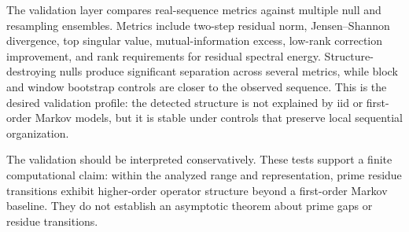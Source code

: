 The validation layer compares real-sequence metrics against multiple null and resampling ensembles. Metrics include two-step residual norm, Jensen--Shannon divergence, top singular value, mutual-information excess, low-rank correction improvement, and rank requirements for residual spectral energy. Structure-destroying nulls produce significant separation across several metrics, while block and window bootstrap controls are closer to the observed sequence. This is the desired validation profile: the detected structure is not explained by iid or first-order Markov models, but it is stable under controls that preserve local sequential organization.

The validation should be interpreted conservatively. These tests support a finite computational claim: within the analyzed range and representation, prime residue transitions exhibit higher-order operator structure beyond a first-order Markov baseline. They do not establish an asymptotic theorem about prime gaps or residue transitions.
